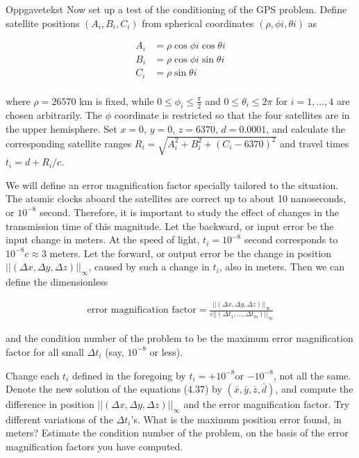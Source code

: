 
Oppgavetekst
Now set up a test of the conditioning of the GPS problem. Define satellite positions $(A_i,B_i,C_i)$ from spherical coordinates $(\rho,\phi i,\theta i)$ as

\begin{align}
	A_i &= \rho \cos{\phi i} \cos{\theta i} \nonumber \\
	B_i &= \rho \cos{\phi i} \sin{\theta i} \nonumber \\
	C_i &= \rho \sin{\theta i} \nonumber \\
\end{align}

where $\rho = 26570$ km is fixed, while $0 \leq \phi_i \leq \frac{\pi}{2}$ and $0 \leq \theta_i \leq 2 \pi$ for $i=1,...,4$ are chosen arbitrarily. The $\phi$ coordinate is restricted so that the four satellites are in the upper hemisphere. Set $x = 0$, $y = 0$, $z = 6370$, $d = 0.0001$, and calculate the corresponding satellite ranges $R_i = \sqrt{A_i^2 + B_i^2 + (C_i − 6370)^2}$ and travel times $t_i = d + R_i /c$.

We will define an error magnification factor specially tailored to the situation. The atomic clocks aboard the satellites are correct up to about 10 nanoseconds, or $10^{−8}$ second. Therefore, it is important to study the effect of changes in the transmission time of this magnitude. Let the backward, or input error be the input change in meters. At the speed of light, $t_i = 10^{−8}$ second corresponds to $10^{−8}c \approx 3$ meters. Let the forward, or output error be the change in position $||(\Delta x,\Delta y,\Delta z)||_\infty$, caused by such a change in $t_i$, also in meters. Then we can define the dimensionless 

\begin{align}
    \text{error magnification factor} = \frac{||(\Delta x,\Delta y,\Delta z)||_\infty}{c||(\Delta t_1,...,\Delta t_m)||_\infty} \nonumber
\end{align}

and the condition number of the problem to be the maximum error magnification factor for all small $\Delta t_i$ (say, $10^{−8}$ or less).

Change each $t_i$ defined in the foregoing by $t_i = +10^{-8}$or $−10^{−8}$, not all the same. Denote the new solution of the equations (4.37) by $(\bar{x},\bar{y},\bar{z},\bar{d})$, and compute the difference in position $||(\Delta x,\Delta y,\Delta z)||_\infty$ and the error magnification factor. Try different variations of the $\Delta t_i$'s. What is the maximum position error found, in meters? Estimate the condition number of the problem, on the basis of the error magnification factors you have computed. 

